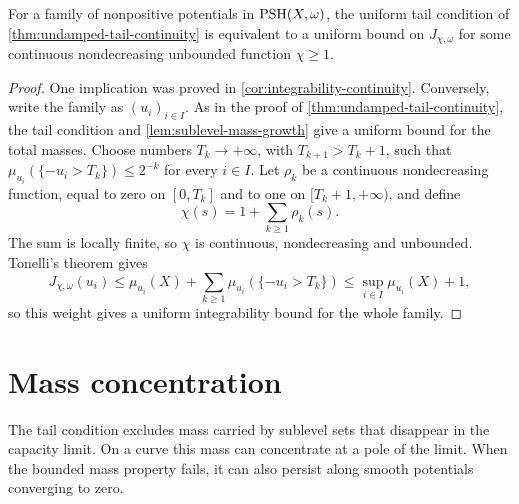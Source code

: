 \begin{proposition}\label{prop:tail-integrability-equivalence}
For a family of nonpositive potentials in $\mathrm{PSH}(X,\omega)$, the uniform tail condition of \cref{thm:undamped-tail-continuity} is equivalent to a uniform bound on $J_{\chi,\omega}$ for some continuous nondecreasing unbounded function $\chi\geq1$.
\end{proposition}
\begin{proof}
One implication was proved in \cref{cor:integrability-continuity}. Conversely, write the family as $(u_i)_{i\in I}$. As in the proof of \cref{thm:undamped-tail-continuity}, the tail condition and \cref{lem:sublevel-mass-growth} give a uniform bound for the total masses. Choose numbers $T_k\to+\infty$, with $T_{k+1}>T_k+1$, such that $\mu_{u_i}(\{-u_i>T_k\})\leq2^{-k}$ for every $i\in I$. Let $\rho_k$ be a continuous nondecreasing function, equal to zero on $[0,T_k]$ and to one on $[T_k+1,+\infty)$, and define
\[
 \chi(s)=1+\sum_{k\geq1}\rho_k(s).
\]
The sum is locally finite, so $\chi$ is continuous, nondecreasing and unbounded. Tonelli's theorem gives
\[
 J_{\chi,\omega}(u_i)
 \leq\mu_{u_i}(X)+\sum_{k\geq1}\mu_{u_i}(\{-u_i>T_k\})
 \leq\sup_{i\in I}\mu_{u_i}(X)+1,
\]
so this weight gives a uniform integrability bound for the whole family.
\end{proof}

\section{Mass concentration}

The tail condition excludes mass carried by sublevel sets that disappear in the capacity limit. On a curve this mass can concentrate at a pole of the limit. When the bounded mass property fails, it can also persist along smooth potentials converging to zero.

